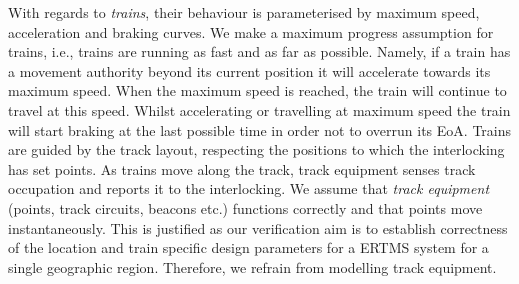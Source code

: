 With regards to \emph{trains}, their behaviour is parameterised by
maximum speed, acceleration and braking curves. We make a maximum
progress assumption for trains, i.e., trains are running as fast and
as far as possible. Namely, if a train has a movement authority beyond
its current position it will accelerate towards its maximum
speed. When the maximum speed is reached, the train will continue to
travel at this speed. Whilst accelerating or travelling at maximum
speed the train will start braking at the last possible time in order
not to overrun its EoA. Trains are guided by the track layout,
respecting the positions to which the interlocking has set points. As
trains move along the track, track equipment senses track occupation
and reports it to the interlocking.
%
%
We assume that \emph{track equipment} (points, track circuits, beacons
etc.) functions correctly and that points move instantaneously. This
is justified as our verification aim is to establish correctness of
the location and train specific design parameters for a ERTMS system
for a single geographic region. Therefore, we refrain from modelling
track equipment.

